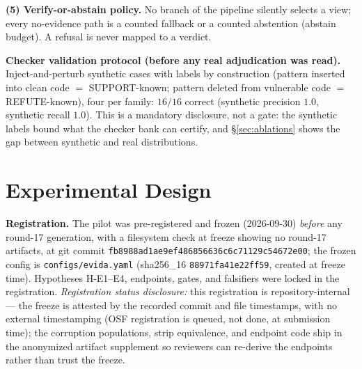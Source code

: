 \documentclass[sigconf,nonacm]{acmart}
\begin{document}
\textbf{(5) Verify-or-abstain policy.} No branch of the pipeline silently
selects a view; every no-evidence path is a counted fallback or a counted
abstention (abstain budget). A refusal is never mapped to a verdict.

\textbf{Checker validation protocol (before any real adjudication was
read).} Inject-and-perturb synthetic cases with labels by construction
(pattern inserted into clean code $=$ SUPPORT-known; pattern deleted from
vulnerable code $=$ REFUTE-known), four per family: $16/16$ correct
(synthetic precision $1.0$, synthetic recall $1.0$). This is a mandatory
disclosure, not a gate: the synthetic labels bound what the checker bank
can certify, and \S\ref{sec:ablations} shows the gap between synthetic and
real distributions.

\section{Experimental Design}\label{sec:design}
\textbf{Registration.} The pilot was pre-registered and frozen
(2026-09-30) \emph{before} any round-17 generation, with a filesystem
check at freeze showing no round-17 artifacts, at git commit
\texttt{fb8988ad1ae9ef486856636c6c71129c54672e00}; the frozen config is
\texttt{configs/evida.yaml} (sha256\_16 \texttt{88971fa41e22ff59},
created at freeze time). Hypotheses H-E1--E4, endpoints, gates, and
falsifiers were locked in the registration. \emph{Registration status
disclosure:} this registration is repository-internal --- the freeze is
attested by the recorded commit and file timestamps, with no external
timestamping (OSF registration is queued, not done, at submission time);
the corruption populations, strip equivalence, and endpoint code ship in
the anonymized artifact supplement so reviewers can re-derive the
endpoints rather than trust the freeze.
\end{document}
